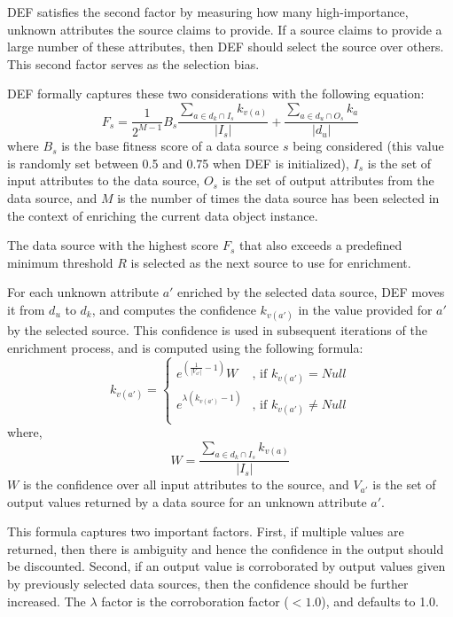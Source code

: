 DEF satisfies the second factor by measuring how many high-importance, unknown attributes the source claims 
to provide. If a source claims to provide a large number of these attributes, then DEF should select the 
source over others. This second factor serves as the selection bias. 

DEF formally captures these two considerations with the following equation:
\begin{equation}
    F_s = \frac{1}{2^{M-1}}B_s \frac{\displaystyle\sum\limits_{a \in d_k \cap I_s} k_{v(a)}}{|I_s|} 
    	+ \frac{\displaystyle\sum\limits_{a \in d_u \cap O_s} k_{a}}{|d_u|}
\end{equation}
where $B_s$ is the base fitness score of a data source $s$ being considered (this value is randomly set between 
0.5 and 0.75 when DEF is initialized), $I_s$ is the set of input attributes to the data source, $O_s$ is 
the set of output attributes from the data source, and $M$ is the number of times the data source has been 
selected in the context of enriching the current data object instance.

The data source with the highest score $F_s$ that also exceeds a predefined minimum threshold $R$ is selected
as the next source to use for enrichment.

For each unknown attribute $a'$ enriched by the selected data source, DEF moves it from $d_u$ to $d_k$, and 
computes the confidence $k_{v(a')}$ in the value provided for $a'$ by the selected source. This confidence 
is used in subsequent iterations of the enrichment process, and is computed using the following formula: 
\begin{equation}
 \label{_output_confidence}
	k_{v(a')} = \left\lbrace 
		\begin{array}{ll}
			e^{ \left( \frac{1}{|V_{a'}|} - 1 \right) } W \nonumber & \mbox{, if } k_{v(a')} = Null \\
			e^{\lambda(k_{v(a')} - 1)} 				& \mbox{, if } k_{v(a')} \neq Null \\
		\end{array}
		\right.
\end{equation}
where,  
\begin{equation}
	W = \frac{\displaystyle\sum\limits_{a \in d_k \cap I_s} k_{v(a)} }{|I_s|}
\end{equation}
$W$ is the confidence over all input attributes to the source, and $V_{a'}$ is the set of output values 
returned by a data source for an unknown attribute $a'$. 

This formula captures two important factors. First, if multiple values are returned, then there is ambiguity 
and hence the confidence in the output should be discounted. Second, if an output value is corroborated 
by output values given by previously selected data sources, then the confidence should be further increased. 
The $\lambda$ factor is the corroboration factor ($< 1.0$), and defaults to 1.0.

